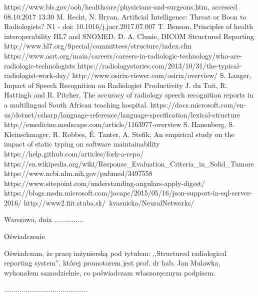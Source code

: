 \documentclass[12pt, twoside, openany]{report}
\theoremstyle{definition}
\begin{document}
\begin{thebibliography}{11}
 https://www.bls.gov/ooh/healthcare/physicians-and-surgeons.htm, accessed 08.10.2017 13:30
 M. Recht, N. Bryan, Artificial Intelligence: Threat or Boon to Radiologists?
N1  - doi: 10.1016/j.jacr.2017.07.007
 T. Benson, Principles of health interoperability HL7 and SNOMED.
 D. A. Clunie, DICOM Structured Reporting
 http://www.hl7.org/Special/committees/structure/index.cfm 
 https://www.asrt.org/main/careers/careers-in-radiologic-technology/who-are-radiologic-technologists
 https://radiologystories.com/2013/10/31/the-typical-radiologist-work-day/
http://www.osirix-viewer.com/osirix/overview/
S. Langer, Impact of Speech Recognition on Radiologist Productivity
 J. du Toit, R. Hattingh and R. Pitcher, The accuracy of radiology speech recognition
reports in a multilingual South African teaching hospital.
https://docs.microsoft.com/en-us/dotnet/csharp/language-reference/language-specification/lexical-structure
 http://emedicine.medscape.com/article/1163977-overview
    S. Hanenberg, S. Kleinschmager, R. Robbes, É. Tanter, A. Stefik, An empirical study on the impact of static typing on software maintainability
 https://help.github.com/articles/fork-a-repo/
https://en.wikipedia.org/wiki/Response\_Evaluation\_Criteria\_in\_Solid\_Tumors
 https://www.ncbi.nlm.nih.gov/pubmed/3497558
 https://www.sitepoint.com/understanding-angulars-apply-digest/
 https://blogs.msdn.microsoft.com/jocapc/2015/05/16/json-support-in-sql-server-2016/
http://www2.fiit.stuba.sk/~kvasnicka/NeuralNetworks/

\end{thebibliography}
\clearpage
\begin{otherlanguage}{polish}
\pagestyle{empty}
\noindent Warszawa, dnia ...............
\vspace{5cm}
\begin{center}
\LARGE{Oświadczenie}
\end{center}
Oświadczam, że pracę inżynierską pod tytułem: ,,Structured radiological reporting system'', której promotorem jest prof. dr hab. Jan Mulawka, wykonałem samodzielnie, co poświadczam własnoręcznym podpisem.
\vspace{2cm}
\begin{flushright}
...........................................
\end{flushright}
\end{otherlanguage}
\end{document}
